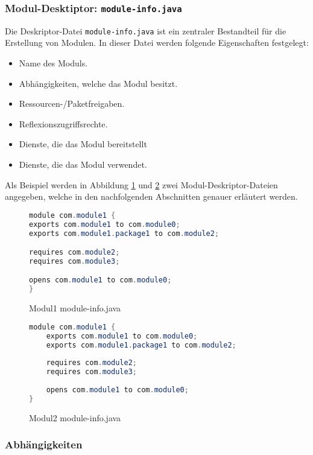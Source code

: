 \subsubsection{Modul-Desktiptor: \texttt{module-info.java}}
Die Deskriptor-Datei \texttt{module-info.java} ist ein zentraler Bestandteil für die Erstellung von Modulen.
In dieser Datei werden folgende Eigenschaften festgelegt:

\begin{itemize}[noitemsep]
	\item Name des Moduls.
	\item Abhängigkeiten, welche das Modul besitzt.
	\item Ressourcen-/Paketfreigaben.
	\item Reflexionszugriffsrechte.
	\item Dienste, die das Modul bereitstellt
	\item Dienste, die das Modul verwendet.
\end{itemize}

Als Beispiel werden in Abbildung \ref{fig:mod1-info} und \ref{fig:mod2-info} zwei Modul-Deskriptor-Dateien angegeben, welche in den nachfolgenden Abschnitten genauer erläutert werden.


\begin{figure}
\begin{lstlisting}[language=java]
module com.module1 {
exports com.module1 to com.module0;
exports com.module1.package1 to com.module2;

requires com.module2;
requires com.module3;

opens com.module1 to com.module0;
}
\end{lstlisting}
\caption{Modul1 module-info.java}
\label{fig:mod1-info}
\end{figure}


\begin{figure}
\begin{lstlisting}[language=java]
module com.module1 {
	exports com.module1 to com.module0;
	exports com.module1.package1 to com.module2;
	
	requires com.module2;
	requires com.module3;
	
	opens com.module1 to com.module0;
}
\end{lstlisting}
\caption{Modul2 module-info.java}
\label{fig:mod2-info}
\end{figure}


\subsubsection{Abhängigkeiten}


